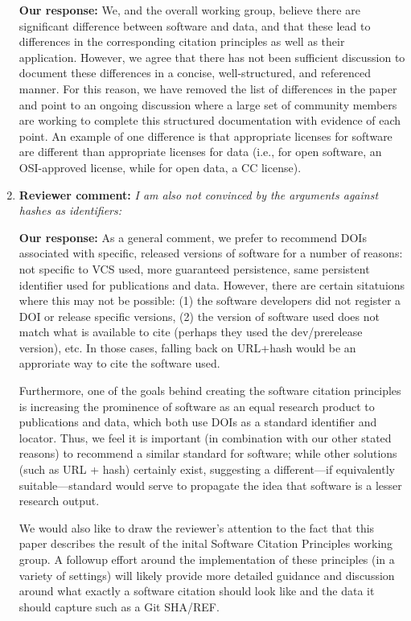 \documentclass{article}
\begin{document}
\begin{enumerate}
\begin{itemize}
\end{itemize}

\textbf{Our response:} We, and the overall working group, believe there are significant difference
between software and data, and that these lead to differences in the corresponding citation principles
as well as their application.
However, we agree that there has not been sufficient discussion to document these
differences in a concise, well-structured, and referenced manner.
For this reason, we have removed the list of differences in the paper and point
to an ongoing discussion where a large set of community members are working
to complete this structured documentation with evidence of each point.  An example
of one difference is that appropriate licenses for software are different than appropriate
licenses for data (i.e., for open software, an OSI-approved license, while for open data, a CC license).


\item \textbf{Reviewer comment:}
\emph{I am also not convinced by the arguments against hashes as identifiers:}

\textbf{Our response:}
As a general comment, we prefer to recommend DOIs associated with specific,
released versions of software for a number of reasons: not specific to VCS used,
more guaranteed persistence, same persistent identifier used for publications and data.
However, there are certain sitatuions where this may not be possible:
(1) the software developers did not register a DOI or release specific
versions, (2) the version of software used does not match what is available
to cite (perhaps they used the dev/prerelease version), etc. In those cases,
falling back on URL+hash would be an approriate way to cite the software used.

Furthermore, one of the goals behind creating the software citation principles
is increasing the prominence of software as an equal research product to
publications and data, which both use DOIs as a standard identifier and locator.
Thus, we feel it is important (in combination with our other stated reasons) to
recommend a similar standard for software; while other solutions (such as URL +
hash) certainly exist, suggesting a different---if equivalently suitable---standard
would serve to propagate the idea that software is a lesser research output.

We would also like to draw the reviewer's attention to the fact that this paper
describes the result of the inital Software Citation Principles working group. A
followup effort around the implementation of these principles (in a variety of
settings) will likely provide more detailed guidance and discussion around what
exactly a software citation should look like and the data it should capture such
as a Git SHA/REF.


\end{enumerate}
\end{document}
